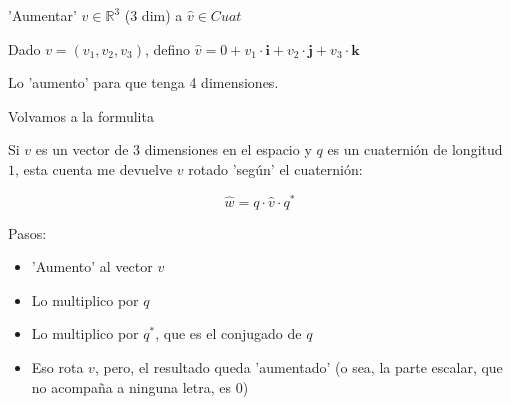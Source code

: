 \documentclass[10pt]{beamer}
\def\R{\mathbb{R}}
\begin{document}
\begin{frame}{'Aumentar' $v \in \R^3$ (3 dim) a $\hat{v} \in Cuat$ }



Dado $v = (v_1,v_2,v_3)$, defino $\hat{v}= 0 + v_1 \cdot \textbf{i} + v_2 \cdot \textbf{j} + v_3 \cdot \textbf{k}$ 

Lo 'aumento' para que tenga 4 dimensiones.


	
\end{frame}

\begin{frame}{Volvamos a la formulita}

Si $v$ es un vector de 3 dimensiones en el espacio y $q$ es un cuaternión de longitud $1$, esta cuenta me devuelve $v$ rotado 'según' el cuaternión:

$$\hat{w} = q \cdot \hat{v} \cdot q^*$$ 

Pasos:

\begin{itemize}
	\item 'Aumento' al vector $v$
	\item Lo multiplico por $q$
	\item Lo multiplico por $q^*$, que es el conjugado de $q$
	\item Eso rota $v$, pero, el resultado queda 'aumentado' (o sea, la parte escalar, que no acompaña a ninguna letra, es $0$)
	
	
\end{itemize}
\end{frame}
\end{document}
